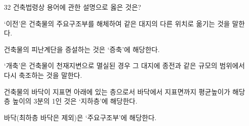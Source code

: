 \begin{question}{32}
건축법령상 용어에 관한 설명으로 옳은 것은?
\begin{choices}
  \item ‘이전’은 건축물의 주요구조부를 해체하여 같은 대지의 다른 위치로 옮기는 것을 말한다.
  \item 건축물의 피난계단을 증설하는 것은 ‘증축’에 해당한다.
  \item ‘개축’은 건축물이 천재지변으로 멸실된 경우 그 대지에 종전과 같은 규모의 범위에서 다시 축조하는 것을 말한다.
  \item 건축물의 바닥이 지표면 아래에 있는 층으로서 바닥에서 지표면까지 평균높이가 해당 층 높이의 3분의 1인 것은 ‘지하층’에 해당한다.
  \item 바닥(최하층 바닥은 제외)은 ‘주요구조부’에 해당한다.
\end{choices}
\end{question}
